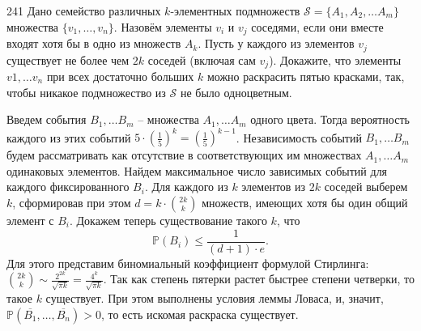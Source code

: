 \begin{task}{241}
Дано семейство различных $k$-элементных подмножеств $\mathcal{S} = \{A_1, A_2, \ldots A_m\}$ множества $\{v_1, \ldots, v_n\}$. Назовём элементы $v_i$ и $v_j$ соседями, если они вместе входят хотя бы в одно из множеств $A_k$. Пусть у каждого из элементов $v_j$ существует не более чем $2k$ соседей (включая сам $v_j$). Докажите, что элементы $v1, \ldots v_n$ при всех достаточно больших $k$ можно раскрасить пятью красками, так, чтобы никакое подмножество из $\mathcal{S}$  не было одноцветным.
\end{task}
\begin{solution}
Введем события $B_1, \ldots B_m$ -- множества $A_1, \ldots A_m$ одного цвета. Тогда вероятность каждого из этих событий $5\cdot \left(\frac{1}{5} \right)^k = \left(\frac{1}{5} \right)^{k-1}$. Независимость событий $B_1, \ldots B_m$ будем рассматривать как отсутствие в соответствующих им множествах $A_1, \ldots A_m$ одинаковых элементов. Найдем максимальное число зависимых событий для каждого фиксированного $B_i$. Для каждого из $k$ элементов из $2k$ соседей выберем $k$, сформировав при этом $d = k\cdot \binom{2k}{k}$ множеств, имеющих хотя бы один общий элемент с $B_i$. Докажем теперь существование такого $k$, что \[\mathds{P}(B_i) \leq \frac{1}{(d+1)\cdot e}.\]
Для этого представим биномиальный коэффициент формулой Стирлинга: $\binom{2k}{k} \sim \frac{2^{2k}}{\sqrt{\pi k}} = \frac{4^{k}}{\sqrt{\pi k}}$. Так как степень пятерки растет быстрее степени четверки, то такое $k$ существует. При этом выполнены условия леммы Ловаса, и, значит, $\mathds{P}(\overline{B_1}, \ldots, \overline{B_n}) > 0$, то есть искомая раскраска существует.
\end{solution}